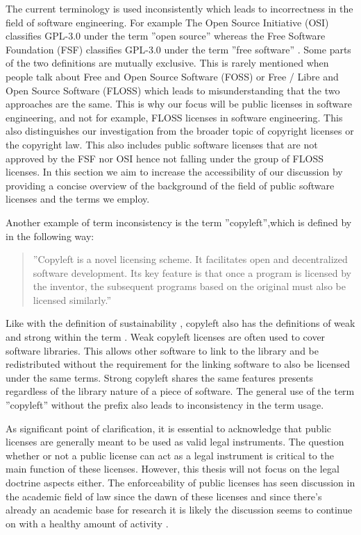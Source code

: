 The current terminology is used inconsistently which leads to incorrectness in the field of software engineering. For example The Open Source Initiative (OSI) classifies GPL-3.0 under the term ''open source'' whereas the Free Software Foundation (FSF) classifies GPL-3.0 under the term ''free software'' \citep{osi:gplv3}\citep{rms:opensource}. Some parts of the two definitions are mutually exclusive. This is rarely mentioned when people talk about Free and Open Source Software (FOSS) or Free / Libre and Open Source Software (FLOSS) which leads to misunderstanding that the two approaches are the same. This is why our focus will be public licenses in software engineering, and not for example, FLOSS licenses in software engineering. This also distinguishes our investigation from the broader topic of copyright licenses or the copyright law. This also includes public software licenses that are not approved by the FSF nor OSI hence not falling under the group of FLOSS licenses. In this section we aim to increase the accessibility of our discussion by providing a concise overview of the background of the field of public software licenses and the terms we employ.

Another example of term inconsistency is the term ''copyleft'',which is defined by \citet{mustonen2003} in the following way:
\begin{quote}
	''Copyleft is a novel licensing scheme. It facilitates open and decentralized software development. Its key feature is that once a program is licensed by the inventor, the subsequent programs based on the original must also be licensed similarly.''
\end{quote}
Like with the definition of sustainability \citep{weak-sustainability}, copyleft also has the definitions of weak and strong within the term \citep{wikipedia:copyleft}. Weak copyleft licenses are often used to cover software libraries. This allows other software to link to the library and be redistributed without the requirement for the linking software to also be licensed under the same terms. Strong copyleft shares the same features \cite{mustonen2003} presents regardless of the library nature of a piece of software. The general use of the term ''copyleft'' without the prefix also leads to inconsistency in the term usage.

As significant point of clarification, it is essential to acknowledge that public licenses are generally meant to be used as valid legal instruments. The question whether or not a public license can act as a legal instrument is critical to the main function of these licenses. However, this thesis will not focus on the legal doctrine aspects either. The enforceability of public licenses has seen discussion in the academic field of law since the dawn of these licenses and since there's already an academic base for research it is likely the discussion seems to continue on with a healthy amount of activity \citep{duisburg2011gpl}.

